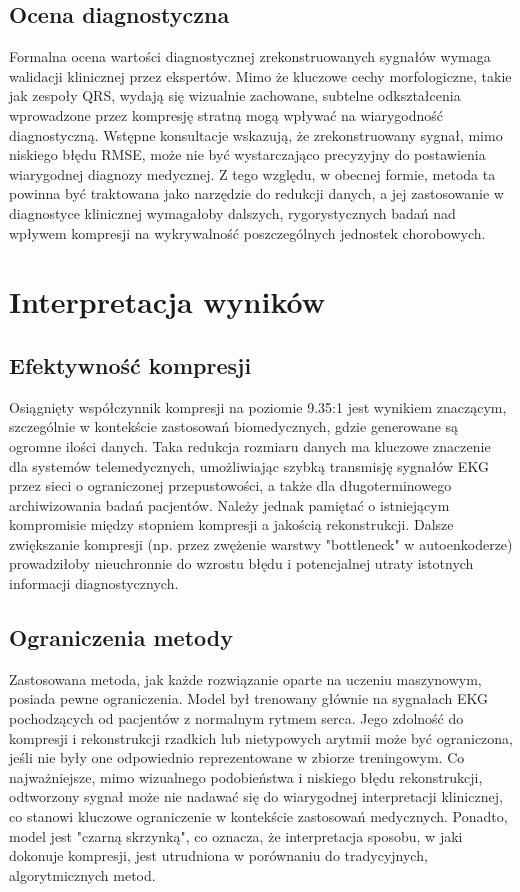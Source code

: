 \documentclass[12pt,a4paper]{article}
\begin{document}
\subsection{Ocena diagnostyczna}

Formalna ocena wartości diagnostycznej zrekonstruowanych sygnałów wymaga walidacji klinicznej przez ekspertów. Mimo że kluczowe cechy morfologiczne, takie jak zespoły QRS, wydają się wizualnie zachowane, subtelne odkształcenia wprowadzone przez kompresję stratną mogą wpływać na wiarygodność diagnostyczną. Wstępne konsultacje wskazują, że zrekonstruowany sygnał, mimo niskiego błędu RMSE, może nie być wystarczająco precyzyjny do postawienia wiarygodnej diagnozy medycznej. Z tego względu, w obecnej formie, metoda ta powinna być traktowana jako narzędzie do redukcji danych, a jej zastosowanie w diagnostyce klinicznej wymagałoby dalszych, rygorystycznych badań nad wpływem kompresji na wykrywalność poszczególnych jednostek chorobowych.

\section{Interpretacja wyników}

\subsection{Efektywność kompresji}

Osiągnięty współczynnik kompresji na poziomie 9.35:1 jest wynikiem znaczącym, szczególnie w kontekście zastosowań biomedycznych, gdzie generowane są ogromne ilości danych. Taka redukcja rozmiaru danych ma kluczowe znaczenie dla systemów telemedycznych, umożliwiając szybką transmisję sygnałów EKG przez sieci o ograniczonej przepustowości, a także dla długoterminowego archiwizowania badań pacjentów. Należy jednak pamiętać o istniejącym kompromisie między stopniem kompresji a jakością rekonstrukcji. Dalsze zwiększanie kompresji (np. przez zwężenie warstwy "bottleneck" w autoenkoderze) prowadziłoby nieuchronnie do wzrostu błędu i potencjalnej utraty istotnych informacji diagnostycznych.

\subsection{Ograniczenia metody}

Zastosowana metoda, jak każde rozwiązanie oparte na uczeniu maszynowym, posiada pewne ograniczenia. Model był trenowany głównie na sygnałach EKG pochodzących od pacjentów z normalnym rytmem serca. Jego zdolność do kompresji i rekonstrukcji rzadkich lub nietypowych arytmii może być ograniczona, jeśli nie były one odpowiednio reprezentowane w zbiorze treningowym. Co najważniejsze, mimo wizualnego podobieństwa i niskiego błędu rekonstrukcji, odtworzony sygnał może nie nadawać się do wiarygodnej interpretacji klinicznej, co stanowi kluczowe ograniczenie w kontekście zastosowań medycznych. Ponadto, model jest "czarną skrzynką", co oznacza, że interpretacja sposobu, w jaki dokonuje kompresji, jest utrudniona w porównaniu do tradycyjnych, algorytmicznych metod.
\end{document}
